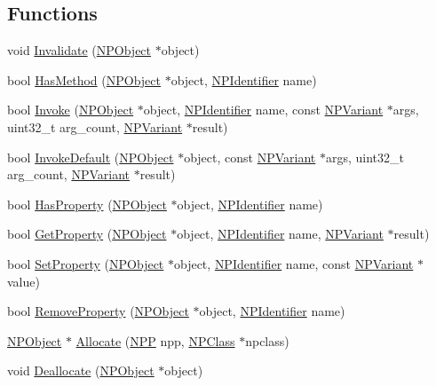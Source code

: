 \subsection*{Functions}
\begin{DoxyCompactItemize}
\item 
void \hyperlink{namespacetumbler_ab219f1f08239d2675431fd3e3299b71d}{Invalidate} (\hyperlink{struct_n_p_object}{NPObject} $\ast$object)
\item 
bool \hyperlink{namespacetumbler_a0440bebe4c3872dbed8390142035d1d1}{HasMethod} (\hyperlink{struct_n_p_object}{NPObject} $\ast$object, \hyperlink{npruntime_8h_a3ce51391e08bd3e24128c342b1d055b9}{NPIdentifier} name)
\item 
bool \hyperlink{namespacetumbler_a1336a275c5d007684384b01b032dec56}{Invoke} (\hyperlink{struct_n_p_object}{NPObject} $\ast$object, \hyperlink{npruntime_8h_a3ce51391e08bd3e24128c342b1d055b9}{NPIdentifier} name, const \hyperlink{struct___n_p_variant}{NPVariant} $\ast$args, uint32\_\-t arg\_\-count, \hyperlink{struct___n_p_variant}{NPVariant} $\ast$result)
\item 
bool \hyperlink{namespacetumbler_a35b1cc267fcf3e0beed6b9e45caa65ef}{InvokeDefault} (\hyperlink{struct_n_p_object}{NPObject} $\ast$object, const \hyperlink{struct___n_p_variant}{NPVariant} $\ast$args, uint32\_\-t arg\_\-count, \hyperlink{struct___n_p_variant}{NPVariant} $\ast$result)
\item 
bool \hyperlink{namespacetumbler_a2f2417690297eb874bfa76c0d125a64e}{HasProperty} (\hyperlink{struct_n_p_object}{NPObject} $\ast$object, \hyperlink{npruntime_8h_a3ce51391e08bd3e24128c342b1d055b9}{NPIdentifier} name)
\item 
bool \hyperlink{namespacetumbler_a41d6ba518f6ce31f8fafc12eb9dd044c}{GetProperty} (\hyperlink{struct_n_p_object}{NPObject} $\ast$object, \hyperlink{npruntime_8h_a3ce51391e08bd3e24128c342b1d055b9}{NPIdentifier} name, \hyperlink{struct___n_p_variant}{NPVariant} $\ast$result)
\item 
bool \hyperlink{namespacetumbler_a036219547d706a1d483feb048bcacc00}{SetProperty} (\hyperlink{struct_n_p_object}{NPObject} $\ast$object, \hyperlink{npruntime_8h_a3ce51391e08bd3e24128c342b1d055b9}{NPIdentifier} name, const \hyperlink{struct___n_p_variant}{NPVariant} $\ast$value)
\item 
bool \hyperlink{namespacetumbler_a4b3edf30d857d6821ff31c7676cae983}{RemoveProperty} (\hyperlink{struct_n_p_object}{NPObject} $\ast$object, \hyperlink{npruntime_8h_a3ce51391e08bd3e24128c342b1d055b9}{NPIdentifier} name)
\item 
\hyperlink{struct_n_p_object}{NPObject} $\ast$ \hyperlink{namespacetumbler_a133c46b3658a35f597bf5806a58c433e}{Allocate} (\hyperlink{struct___n_p_p}{NPP} npp, \hyperlink{struct_n_p_class}{NPClass} $\ast$npclass)
\item 
void \hyperlink{namespacetumbler_a6e665bba23bf978176f39f24fd07d501}{Deallocate} (\hyperlink{struct_n_p_object}{NPObject} $\ast$object)
\end{DoxyCompactItemize}


